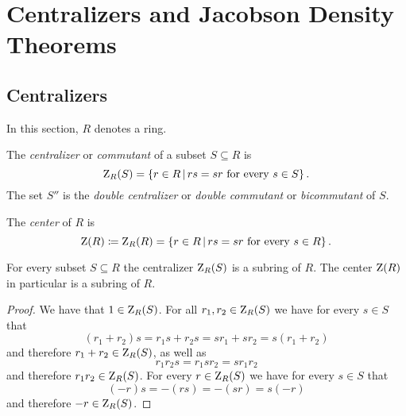 \section{Centralizers and Jacobson Density Theorems}





\subsection{Centralizers}
\label{subsection: centralizers}


\begin{conventions}
  In this section, $R$ denotes a ring.
\end{conventions}


\begin{definition}
  The \emph{centralizer} or \emph{commutant} of a subset $S \subseteq R$ is
  \[
      \centralizer_R(S)
    = \{
        r \in R
      \suchthat
        \text{$rs = sr$ for every $s \in S$}
      \} \,.
  \]
  The set $S''$ is the \emph{double centralizer} or \emph{double commutant} or \emph{bicommutant} of $S$.
\end{definition}


\begin{definition}
  The \emph{center} of $R$ is
  \[
              \ringcenter(R)
    \defined  \centralizer_R(R)
    =         \{
                r \in R
              \suchthat
                \text{$rs = sr$ for every $s \in R$}
              \} \,.
  \]
\end{definition}


\begin{lemma}
  For every subset $S \subseteq R$ the centralizer $\operatorname{Z}_R(S)$ is a subring of $R$.
  The center $\operatorname{Z}(R)$ in particular is a subring of $R$.
\end{lemma}


\begin{proof}
  We have that $1 \in \operatorname{Z}_R(S)$.
  For all $r_1, r_2 \in \operatorname{Z}_R(S)$ we have for every $s \in S$ that
  \[
      (r_1 + r_2)s
    = r_1 s + r_2 s
    = s r_1 + s r_2
    = s (r_1 + r_2)
  \]
  and therefore $r_1 + r_2 \in \operatorname{Z}_R(S)$, as well as
  \[
      r_1 r_2 s
    = r_1 s r_2
    = s r_1 r_2
  \]
  and therefore $r_1 r_2 \in \operatorname{Z}_R(S)$.
  For every $r \in \operatorname{Z}_R(S)$ we have for every $s \in S$ that
  \[
      (-r) s
    = - (rs)
    = - (sr)
    = s (-r)
  \]
  and therefore $-r \in \operatorname{Z}_R(S)$.
\end{proof}


